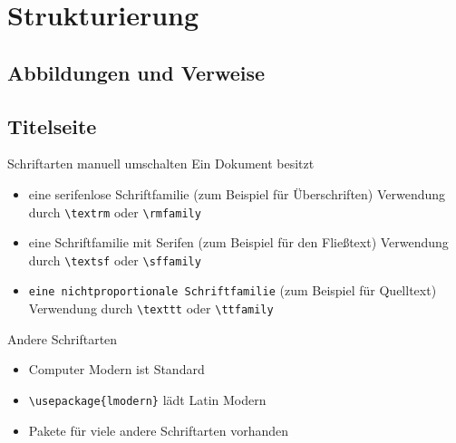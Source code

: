 
\section{Strukturierung}

\subsection{Abbildungen und Verweise}


\subsection{Titelseite}

\begin{frame}
  \begin{center}
  \end{center}
\end{frame}

\begin{frame}[fragile]{Schriftarten manuell umschalten}
  Ein Dokument besitzt
  \begin{itemize}
    \item \textsf{eine serifenlose Schriftfamilie}\newline
      (zum Beispiel für Überschriften)\newline
      Verwendung durch \lstinline-\textrm- oder \lstinline-\rmfamily-
    \item \textrm{eine Schriftfamilie mit Serifen}\newline
      (zum Beispiel für den Fließtext)\newline
      Verwendung durch \lstinline-\textsf- oder \lstinline-\sffamily-
    \item \texttt{eine nichtproportionale Schriftfamilie}\newline
      (zum Beispiel für Quelltext)\newline
      Verwendung durch \lstinline-\texttt- oder \lstinline-\ttfamily-
  \end{itemize}

  \xxx

  \begin{exampleblock}{Andere Schriftarten}
    \begin{itemize}
      \item Computer Modern ist Standard
      \item \lstinline-\usepackage{lmodern}- lädt Latin Modern
      \item Pakete für viele andere Schriftarten vorhanden
    \end{itemize}
  \end{exampleblock}
\end{frame}

